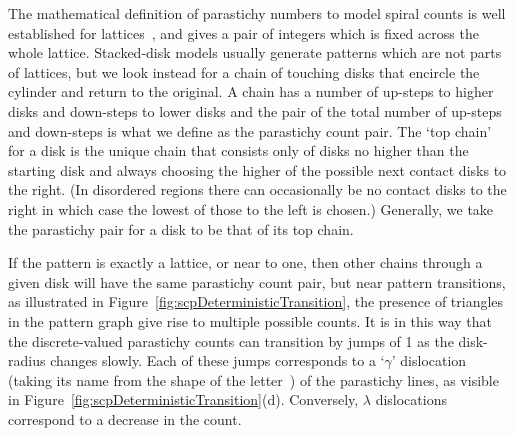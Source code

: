 \documentclass[a4paper,10pt]{amsart}
\begin{document}
The mathematical definition of parastichy numbers to model spiral counts is well established for lattices~\cite{swintonMathematicalPhyllotaxis2023}, and gives a pair of integers which is fixed across the whole lattice. Stacked-disk models usually generate patterns which are not parts of lattices, but we look instead for a chain of touching disks that encircle the cylinder and return to the original.   A chain has a number of up-steps to higher disks and down-steps to lower disks and the pair of the total number of up-steps and down-steps is what we define as the parastichy count pair. The `top chain' for a disk is the unique chain that consists only of disks no higher than the starting disk and always choosing the higher of the possible next contact disks to the right. (In disordered regions there can occasionally be no contact disks to the right in which case the lowest of those to the left is chosen.)  Generally, we take the parastichy pair for a disk to be that of its top chain. 

If the pattern is exactly a lattice, or near to one,
then other chains  through a given disk will have the same parastichy count pair, but near pattern transitions, as illustrated in Figure~\ref{fig:scpDeterministicTransition}, the presence of triangles in the pattern graph give rise to  multiple possible  counts. It is in this way that the discrete-valued parastichy counts can transition by jumps of 1 as the disk-radius changes slowly. 
Each of these jumps corresponds to a `$\gamma$' dislocation (taking its name from the shape of the letter~\cite{zagorska-marekPhyllotacticPatternsTransitions1985}) of the parastichy lines,  as visible in Figure~\ref{fig:scpDeterministicTransition}(d). 
Conversely, $\lambda$ dislocations correspond to a decrease in the count.
\end{document}
